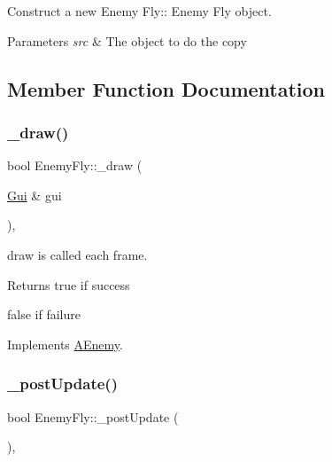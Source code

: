 Construct a new Enemy Fly\+:\+: Enemy Fly object. 


\begin{DoxyParams}{Parameters}
{\em src} & The object to do the copy \\
\hline
\end{DoxyParams}


\subsection{Member Function Documentation}
\mbox{\label{class_enemy_fly_a405b9f97c6818d2b96056270aeca921f}} 
\subsubsection{\texorpdfstring{\+\_\+draw()}{\_draw()}}
{\footnotesize\ttfamily bool Enemy\+Fly\+::\+\_\+draw (\begin{DoxyParamCaption}\item[{\hyperlink{class_gui}{Gui} \&}]{gui }\end{DoxyParamCaption})\hspace{0.3cm}{\ttfamily [protected]}, {\ttfamily [virtual]}}



draw is called each frame. 

\begin{DoxyReturn}{Returns}
true if success 

false if failure 
\end{DoxyReturn}


Implements \hyperlink{class_a_enemy_a70e3638b5ed8ecea2a087ffe16510dd2}{A\+Enemy}.

\mbox{\label{class_enemy_fly_a21dc66b578a2d1158b32f103854a84be}} 
\subsubsection{\texorpdfstring{\+\_\+post\+Update()}{\_postUpdate()}}
{\footnotesize\ttfamily bool Enemy\+Fly\+::\+\_\+post\+Update (\begin{DoxyParamCaption}{ }\end{DoxyParamCaption})\hspace{0.3cm}{\ttfamily [protected]}, {\ttfamily [virtual]}}



